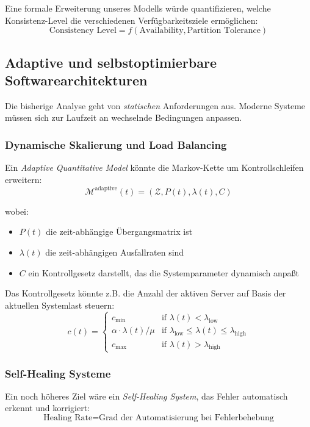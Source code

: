 \documentclass[a4paper,11pt]{article}
\theoremstyle{definition}
\begin{document}
Eine formale Erweiterung unseres Modells würde quantifizieren, welche Konsistenz-Level 
die verschiedenen Verfügbarkeitsziele ermöglichen:
\[
    \text{Consistency Level} = f(\text{Availability}, \text{Partition Tolerance})
\]

\subsection{Adaptive und selbstoptimierbare Softwarearchitekturen}

Die bisherige Analyse geht von \emph{statischen} Anforderungen aus. Moderne Systeme müssen sich 
zur Laufzeit an wechselnde Bedingungen anpassen.

\subsubsection{Dynamische Skalierung und Load Balancing}

Ein \emph{Adaptive Quantitative Model} könnte die Markov-Kette um Kontrollschleifen erweitern:
\[
    \mathcal{M}^{\text{adaptive}}(t) = (\mathcal{Z}, P(t), \lambda(t), C)
\]

wobei:
\begin{itemize}
    \item $P(t)$ die zeit-abhängige Übergangsmatrix ist
    \item $\lambda(t)$ die zeit-abhängigen Ausfallraten sind
    \item $C$ ein Kontrollgesetz darstellt, das die Systemparameter dynamisch anpaßt
\end{itemize}

Das Kontrollgesetz könnte z.B. die Anzahl der aktiven Server auf Basis der aktuellen 
Systemlast steuern:
\[
    c(t) = \begin{cases}
        c_{\min} & \text{if } \lambda(t) < \lambda_{\text{low}} \\
        \alpha \cdot \lambda(t) / \mu & \text{if } \lambda_{\text{low}} \leq \lambda(t) \leq \lambda_{\text{high}} \\
        c_{\max} & \text{if } \lambda(t) > \lambda_{\text{high}}
    \end{cases}
\]

\subsubsection{Self-Healing Systeme}

Ein noch höheres Ziel wäre ein \emph{Self-Healing System}, das Fehler automatisch erkennt und 
korrigiert:
\[
    \text{Healing Rate} = \text{Grad der Automatisierung bei Fehlerbehebung}
\]
\end{document}
